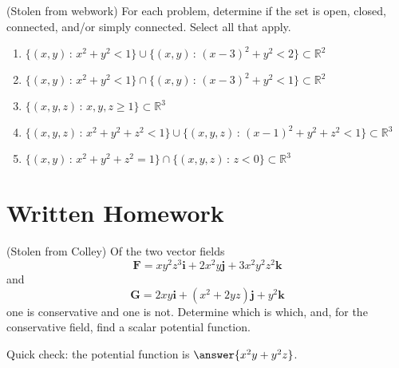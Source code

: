 \documentclass{ximera}
\begin{document}
\begin{problem}
(Stolen from webwork) For each problem, determine if the set is open, closed, connected, and/or simply connected. Select all that apply.
\begin{enumerate}
\item $\{(x,y)\,:\,x^2+y^2<1\}\cup\{(x,y)\,:\,(x-3)^2+y^2<2\}\subset \mathbb{R}^2$
\begin{selectAll}
  \end{selectAll}
\item $\{(x,y)\,:\,x^2+y^2<1\}\cap\{(x,y)\,:\,(x-3)^2+y^2<1\}\subset \mathbb{R}^2$
\begin{selectAll}
  \end{selectAll}
\item $\{(x,y,z)\,:\,x,y,z\geq 1\}\subset \mathbb{R}^3$
\begin{selectAll}
  \end{selectAll}
  \item $\{(x,y,z)\,:\,x^2+y^2+z^2<1\}\cup\{(x,y,z)\,:\,(x-1)^2+y^2+z^2<1\}\subset \mathbb{R}^3$
\begin{selectAll}
  \end{selectAll}
\item $\{(x,y)\,:\,x^2+y^2+z^2=1\}\cap\{(x,y,z)\,:\,z<0\}\subset \mathbb{R}^3$
\begin{selectAll}
  \end{selectAll}
\end{enumerate}
\end{problem}

\section{Written Homework}

\begin{problem}
(Stolen from Colley) Of the two vector fields
\[
\mathbf{F}=xy^2z^3\mathbf{i}+2x^2y\mathbf{j}+3x^2y^2z^2\mathbf{k}
\]
and
\[
\mathbf{G}=2xy\mathbf{i}+(x^2+2yz)\mathbf{j}+y^2\mathbf{k}
\]
one is conservative and one is not. Determine which is which, and, for the conservative field, find a scalar potential function.

Quick check: the potential function is $\answer{x^2y+y^2z}$.
\end{problem}
\end{document}
